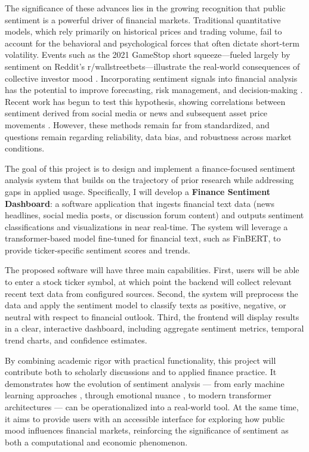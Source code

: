 \documentclass[12pt]{article}
\begin{document}
The significance of these advances lies in the growing recognition that public sentiment is a powerful 
driver of financial markets. Traditional quantitative models, which rely primarily on historical prices 
and trading volume, fail to account for the behavioral and psychological forces that often dictate 
short-term volatility. Events such as the 2021 GameStop short squeeze—fueled largely by sentiment on 
Reddit's r/wallstreetbets—illustrate the real-world consequences of collective investor mood 
\cite{Desiderio_2025}. Incorporating sentiment signals into financial analysis has the potential to 
improve forecasting, risk management, and decision-making \cite{jiang2025financialsentiment}. Recent 
work has begun to test this hypothesis, showing correlations between sentiment derived from social 
media or news and subsequent asset price movements \cite{10.1109/MCI.2018.2866727}. However, these 
methods remain far from standardized, and questions remain regarding reliability, data bias, and 
robustness across market conditions.

The goal of this project is to design and implement a finance-focused sentiment analysis system that 
builds on the trajectory of prior research while addressing gaps in applied usage. Specifically, I will 
develop a \textbf{Finance Sentiment Dashboard}: a software application that ingests financial text data 
(news headlines, social media posts, or discussion forum content) and outputs sentiment classifications 
and visualizations in near real-time. The system will leverage a transformer-based model fine-tuned for 
financial text, such as FinBERT, to provide ticker-specific sentiment scores and trends.

The proposed software will have three main capabilities. First, users will be able to enter a stock 
ticker symbol, at which point the backend will collect relevant recent text data from configured 
sources. Second, the system will preprocess the data and apply the sentiment model to classify texts 
as positive, negative, or neutral with respect to financial outlook. Third, the frontend will display 
results in a clear, interactive dashboard, including aggregate sentiment metrics, temporal trend charts, 
and confidence estimates.

By combining academic rigor with practical functionality, this project will contribute both to scholarly 
discussions and to applied finance practice. It demonstrates how the evolution of sentiment analysis — 
from early machine learning approaches \cite{10.3115/1118693.1118704}, through emotional nuance 
\cite{SentimentEmotionSurvey2021}, to modern transformer architectures 
\cite{10.1145/3586075,10.1145/3543873.3587605} — can be operationalized into a real-world tool. At the 
same time, it aims to provide users with an accessible interface for exploring how public mood 
influences financial markets, reinforcing the significance of sentiment as both a computational and 
economic phenomenon.
\end{document}
